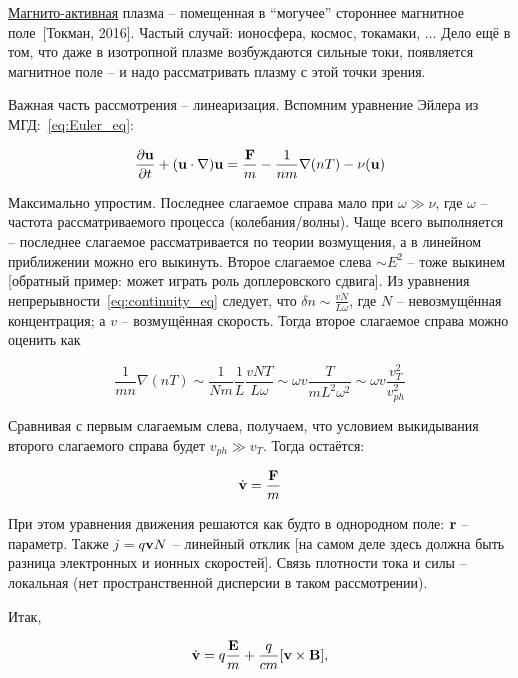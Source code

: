 \documentclass[10pt, a4paper]{article}
\newcommand{\Tokman}{~[Токман, 2016]}
\begin{document}
\uline{Магнито-активная} плазма -- помещенная в ``могучее'' стороннее магнитное поле\Tokman. Частый случай: ионосфера, космос, токамаки, $\ldots$ Дело ещё в том, что даже в изотропной плазме возбуждаются сильные токи, появляется магнитное поле -- и надо рассматривать плазму с этой точки зрения.

Важная часть рассмотрения -- линеаризация. Вспомним уравнение Эйлера из МГД:~\eqref{eq:Euler_eq}:

\begin{equation*}
	\pdv{\vb{u}}{t}+(\vb{u}\cdot\nabla)\vb{u} = \frac{\vb{F}}{m} -\frac{1}{nm}\nabla(nT)-\nu(\vb{u})
\end{equation*}

Максимально упростим. Последнее слагаемое справа мало при $\omega\gg\nu$, где $\omega$ -- частота рассматриваемого процесса (колебания/волны). Чаще всего выполняется -- последнее слагаемое рассматривается по теории возмущения, а в линейном приближении можно его выкинуть. Второе слагаемое слева $\sim E^2$ -- тоже выкинем [обратный пример: может играть роль доплеровского сдвига]. Из уравнения непрерывности~\eqref{eq:continuity_eq} следует, что $\delta n \sim \frac{vN}{L\omega}$, где $N$ -- невозмущённая концентрация; а $v$ -- возмущённая скорость. Тогда второе слагаемое справа можно оценить как

\begin{equation*}
	\frac{1}{mn}\nabla(nT)\sim\frac{1}{Nm}\frac{1}{L}\frac{vNT}{L\omega}\sim\omega v\frac{T}{mL^2\omega^2}\sim\omega v\frac{v_T^2}{v_{ph}^2}
\end{equation*} 

Сравнивая с первым слагаемым слева, получаем, что условием выкидывания второго слагаемого справа будет $v_{ph}\gg v_T$. Тогда остаётся:

\begin{equation*}
	\dot{\vb{v}}=\frac{\vb{F}}{m}
\end{equation*}

При этом уравнения движения решаются как будто в однородном поле: $\vb{r}$ -- параметр. Также $j = q\vb{v}N$ -- линейный отклик [на самом деле здесь должна быть разница электронных и ионных скоростей]. Связь плотности тока и силы -- локальная (нет пространственной дисперсии в таком рассмотрении).

Итак,

\begin{equation*}
	\dot{\vb{v}}=q\frac{\vb{E}}{m}+\frac{q}{cm}[\vb{v}\times\vb{B}],
\end{equation*}
\end{document}
